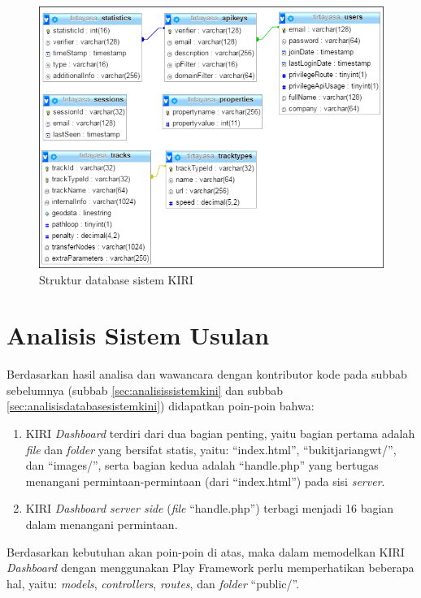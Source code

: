 \begin{figure}[htbp]
	\centering
		\includegraphics[scale=0.8]{Gambar/4_strukturdatabase.PNG}
	\caption{Struktur database sistem KIRI}
	\label{fig:4_strukturdatabase}
\end{figure}


\section{Analisis Sistem Usulan}
\label{sec:analisissistemusulan}
Berdasarkan hasil analisa dan wawancara dengan kontributor kode pada subbab sebelumnya (subbab \ref{sec:analisissistemkini} dan subbab \ref{sec:analisisdatabasesistemkini}) didapatkan poin-poin bahwa:
\begin{enumerate}
	\item KIRI \textit{Dashboard} terdiri dari dua bagian penting, yaitu bagian pertama adalah \textit{file} dan \textit{folder} yang bersifat statis, yaitu: ``index.html'', ``bukitjariangwt/'', dan ``images/'', serta bagian kedua adalah ``handle.php'' yang bertugas menangani permintaan-permintaan (dari ``index.html'') pada sisi \textit{server}.
	\item KIRI \textit{Dashboard server side} (\textit{file} ``handle.php'') terbagi menjadi 16 bagian dalam menangani permintaan.
\end{enumerate}

Berdasarkan kebutuhan akan poin-poin di atas, maka dalam memodelkan KIRI \textit{Dashboard} dengan menggunakan Play Framework perlu memperhatikan beberapa hal, yaitu: \textit{models}, \textit{controllers}, \textit{routes}, dan \textit{folder} ``public/''.


